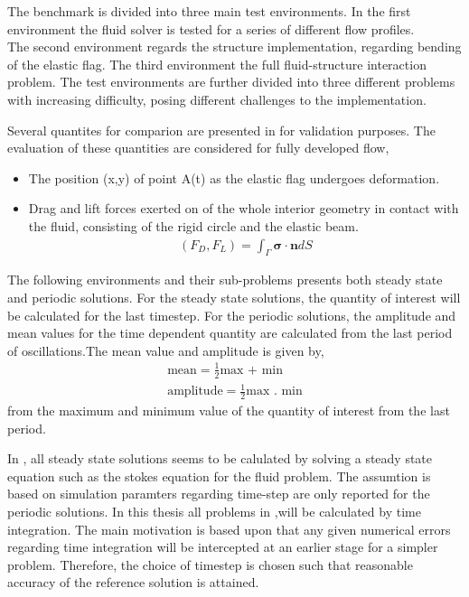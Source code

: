 The benchmark is divided into three main test environments.
In the first environment the fluid solver is tested for a series of different flow profiles. \\
The second environment regards the structure implementation, regarding bending of the elastic flag. The third environment the full fluid-structure interaction problem.
The test environments are further divided into three different problems with increasing difficulty, posing different challenges to the implementation.

 Several quantites for comparion are presented in \cite{Hron2006} for validation purposes. The evaluation of these quantities are considered for fully developed flow,

\begin{itemize}
\item The position (x,y) of point A(t) as the elastic flag undergoes deformation.
\item Drag and lift forces exerted on of the whole interior geometry in contact with the fluid, consisting of the rigid circle and the elastic beam.
\begin{align*}
(F_D, F_L) = \int_{\Gamma} \mathbf{\sigma} \cdot \mathbf{n} dS
\end{align*}
\end{itemize}

The following environments and their sub-problems presents both steady state and periodic solutions. For the steady state solutions, the quantity of interest will be calculated for the last timestep. For the periodic solutions, the amplitude and mean values for the time dependent quantity are calculated from the last period of oscillations.The mean value and amplitude is given by,
\begin{align*}
\text{mean} = \frac{1}{2} \text{max + min} \\
\text{amplitude} = \frac{1}{2} \text{max . min}
\end{align*}
from the maximum and minimum value of the quantity of interest from the last period.  

 In \cite{Hron2006}, all steady state solutions seems to be calulated by solving a steady state equation such as the stokes equation for the fluid problem. The assumtion is based on simulation paramters regarding time-step are only reported for the periodic solutions. In this thesis all problems in \cite{Hron2006},will be calculated by time integration. The main motivation is based upon that any given numerical errors regarding time integration will be intercepted at an earlier stage for a simpler problem. Therefore, the choice of timestep  is chosen such that reasonable accuracy of the reference solution is attained.

